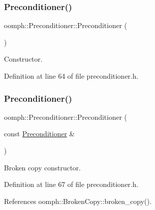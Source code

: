 \subsubsection{\texorpdfstring{Preconditioner()}{Preconditioner()}\hspace{0.1cm}{\footnotesize\ttfamily [1/2]}}
{\footnotesize\ttfamily oomph\+::\+Preconditioner\+::\+Preconditioner (\begin{DoxyParamCaption}{ }\end{DoxyParamCaption})\hspace{0.3cm}{\ttfamily [inline]}}



Constructor. 



Definition at line 64 of file preconditioner.\+h.

\mbox{\label{classoomph_1_1Preconditioner_ab1bf593b1c36c215423bbdb5a360388a}} 
\subsubsection{\texorpdfstring{Preconditioner()}{Preconditioner()}\hspace{0.1cm}{\footnotesize\ttfamily [2/2]}}
{\footnotesize\ttfamily oomph\+::\+Preconditioner\+::\+Preconditioner (\begin{DoxyParamCaption}\item[{const \hyperlink{classoomph_1_1Preconditioner}{Preconditioner} \&}]{ }\end{DoxyParamCaption})\hspace{0.3cm}{\ttfamily [inline]}}



Broken copy constructor. 



Definition at line 67 of file preconditioner.\+h.



References oomph\+::\+Broken\+Copy\+::broken\+\_\+copy().

\mbox{\label{classoomph_1_1Preconditioner_ab60952a82cc1b6b91fff5924eaa62c0e}} 

